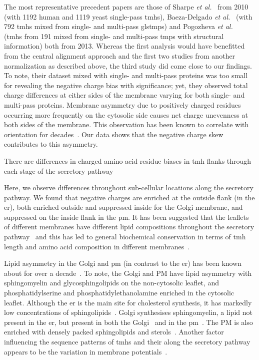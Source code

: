 The most representative precedent papers are those of Sharpe \textit{et al.}~\cite{Sharpe2010} from 2010 (with 1192 human and 1119 yeast single-pass \gls{tmh}s), Baeza-Delgado \textit{et al.}~\cite{Baeza-Delgado2013} (with 792 \gls{tmh}s mixed from single- and multi-pass gls{tmp}s) and Pogozheva \textit{et al.}~\cite{Pogozheva2013} (\gls{tmh}s from 191 mixed from single- and multi-pass \gls{tmp}s with structural information) both from 2013. Whereas the first analysis would have benefitted from the central alignment approach and the first two studies from another normalization as described above, the third study did come close to our findings. To note, their dataset mixed with single- and multi-pass proteins was too small for revealing the negative charge bias with significance; yet, they observed total charge differences at either sides of the membrane varying for both single- and multi-pass proteins. Membrane asymmetry due to positively charged residues occurring more frequently on the cytosolic side causes net charge unevenness at both sides of the membrane. This observation has been known to correlate with orientation for decades~\cite{VonHeijne1989, Baeza-Delgado2013, Meindl-Beinker2006}. Our data shows that the negative charge skew contributes to this asymmetry.

There are differences in charged amino acid residue biases in \gls{tmh} flanks through each stage of the secretory pathway

Here, we observe differences throughout sub-cellular locations along the secretory pathway. We found that negative charges are enriched at the outside flank (in the \gls{er}), both enriched outside and suppressed inside for the Golgi membrane, and suppressed on the inside flank in the \gls{pm}. It has been suggested that the leaflets of different membranes have different lipid compositions throughout the secretory pathway~\cite{VanMeer2008} and this has led to general biochemical conservation in terms of \gls{tmh} length and amino acid composition in different membranes~\cite{Sharpe2010, Pogozheva2013}.

Lipid asymmetry in the Golgi and \gls{pm} (in contrast to the \gls{er}) has been known about for over a decade~\cite{Daleke2007, Devaux2004}. To note, the Golgi and PM have lipid asymmetry with sphingomyelin and glycosphingolipids on the non-cytosolic leaflet, and phosphatidylserine and phosphatidylethanolamine enriched in the cytosolic leaflet. Although the \gls{er} is the main site for cholesterol synthesis, it has markedly low concentrations of sphingolipids~\cite{Bell1981}. Golgi synthesises sphingomyelin, a lipid not present in the \gls{er}, but present in both the Golgi~\cite{Futerman2005} and in the \gls{pm}~\cite{Li2007, Tafesse2007}. The PM is also enriched with densely packed sphingolipids and sterols~\cite{DiPaolo2006}. Another factor influencing the sequence patterns of \gls{tmh}s and their along the secretory pathway appears to be the variation in membrane potentials~\cite{Qin2011, Worley1994, Schapiro2000}.

